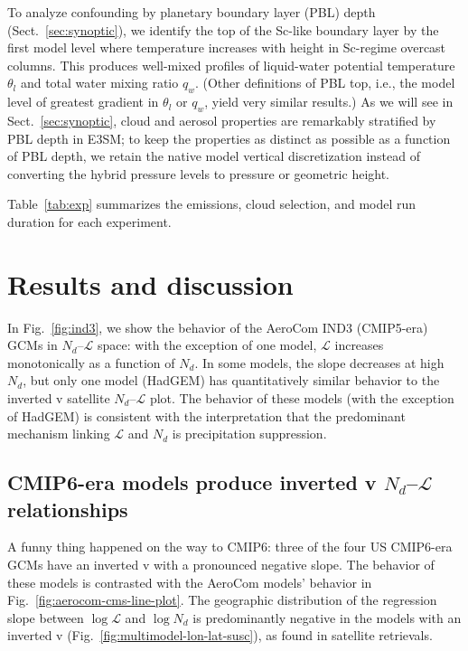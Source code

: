 \documentclass[acp, manuscript]{copernicus}\usepackage[]{graphicx}\usepackage[]{xcolor}
\newcommand\nd{\ensuremath{N_d}}
\newcommand\lwp{\ensuremath{\mathcal L}}
\begin{document}
To analyze confounding by planetary boundary layer (PBL) depth (Sect.~\ref{sec:synoptic}), we identify the top of
the Sc-like boundary layer by the first model level where temperature
increases with height in Sc-regime overcast columns.  This produces well-mixed
profiles of liquid-water potential temperature $\theta_l$ and total water mixing
ratio $q_w$.  (Other definitions of PBL top, i.e., the model level of
greatest gradient in $\theta_l$ or $q_w$, yield very similar results.)
As we will see in Sect.~\ref{sec:synoptic}, cloud and aerosol properties
are remarkably stratified by PBL depth in E3SM; to keep the properties as
distinct as possible as a function of PBL depth, we retain the native model
vertical discretization instead of converting the hybrid pressure levels to
pressure or geometric height.

Table~\ref{tab:exp} summarizes the emissions, cloud selection, and model run duration
for each experiment.

\section{Results and discussion}

In Fig.~\ref{fig:ind3}, we show the behavior of the AeroCom IND3 (CMIP5-era) GCMs in
\nd{}--\lwp{} space: with
the exception of one model, \lwp{} increases monotonically as a function of \nd.
In some models, the slope decreases at high \nd{}, but only one model (HadGEM)
has quantitatively similar behavior to the inverted v satellite \nd--\lwp{}
plot.  The behavior of these models (with the exception of HadGEM) is consistent
with the interpretation that the predominant mechanism linking \lwp{} and \nd{} is
precipitation suppression. 

\subsection{CMIP6-era models produce inverted v \nd--\lwp{} relationships}

A funny thing happened on the way to CMIP6: three of the four US CMIP6-era GCMs
have an inverted v with a pronounced negative slope.  The behavior of
these models is contrasted with the AeroCom models' behavior in
Fig.~\ref{fig:aerocom-cms-line-plot}.  The geographic distribution of the regression slope between
$\log\lwp$ and $\log\nd$ is predominantly negative in the models with an
inverted v (Fig.~\ref{fig:multimodel-lon-lat-susc}), as \citet{Gryspeerdt2019}
found in satellite retrievals.
\end{document}
